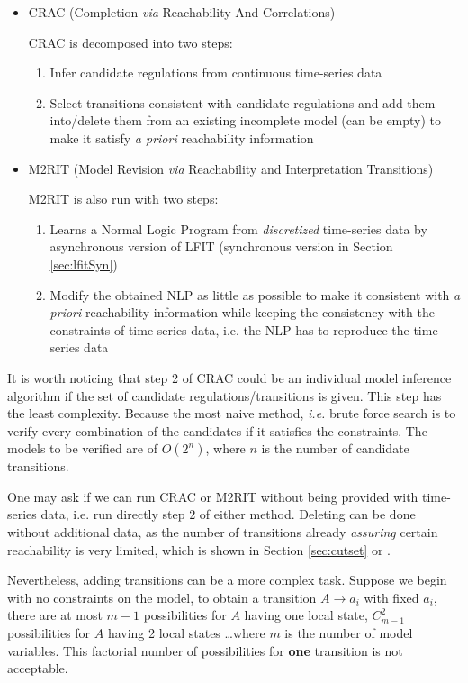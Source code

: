 \begin{itemize}
    \item CRAC (Completion \textit{via} Reachability And Correlations)
    
    CRAC is decomposed into two steps:
    \begin{enumerate}
        \item Infer candidate regulations from continuous time-series data
        \item Select transitions consistent with candidate regulations and add them into/delete them from an existing incomplete model (can be empty) to make it satisfy \textit{a priori} reachability information
    \end{enumerate}
    \item M2RIT (Model Revision \textit{via} Reachability and Interpretation Transitions)
    
    M2RIT is also run with two steps:
    \begin{enumerate}
        \item Learns a Normal Logic Program from \textit{discretized} time-series data by asynchronous version of LFIT (synchronous version in Section \ref{sec:lfitSyn})
        \item Modify the obtained NLP as little as possible to make it consistent with \textit{a priori} reachability information while keeping the consistency with the constraints of time-series data, i.e. the NLP has to reproduce the time-series data
    \end{enumerate}
\end{itemize}

It is worth noticing that step 2 of CRAC could be an individual model inference algorithm if the set of candidate regulations/transitions is given.
This step has the least complexity.
Because the most naive method, \textit{i.e.} brute force search is to verify every combination of the candidates if it satisfies the constraints. 
The models to be verified are of $O(2^n)$, where $n$ is the number of candidate transitions.

One may ask if we can run CRAC or M2RIT without being provided with time-series data, i.e. run directly step 2 of either method.
Deleting can be done without additional data, as the number of transitions already \textit{assuring} certain reachability is very limited, which is shown in Section \ref{sec:cutset} or \cite{PAK13-CAV}.

Nevertheless, adding transitions can be a more complex task.
Suppose we begin with no constraints on the model, to obtain a transition $A\to a_i$ with fixed $a_i$, there are at most $m-1$ possibilities for $A$ having one local state, $C_{m-1}^2$ possibilities for $A$ having 2 local states \ldots where $m$ is the number of model variables.
This factorial number of possibilities for \textbf{one} transition is not acceptable.

